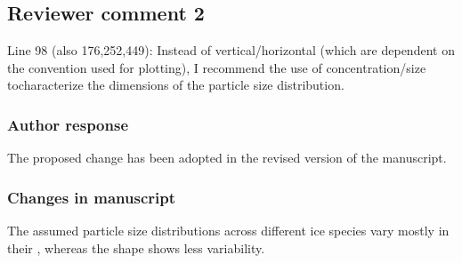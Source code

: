 \subsection*{Reviewer comment 2}

Line 98 (also 176,252,449): Instead of vertical/horizontal (which are
dependent on the convention used for plotting), I recommend the use of
concentration/size tocharacterize the dimensions of the particle size
distribution.

\subsubsection*{Author response}

The proposed change has been adopted in the revised version of the manuscript.

\subsubsection*{Changes in manuscript}

\begin{change}[105]
The \DIFdelbegin {}\DIFdelend assumed particle size distributions across
different ice species vary mostly in their \DIFdelbegin {}\DIFdelend \DIFaddbegin {}\DIFaddend , whereas the \DIFdelbegin {}\DIFdelend \DIFaddbegin {}\DIFaddend shape shows less variability.
\end{change}

